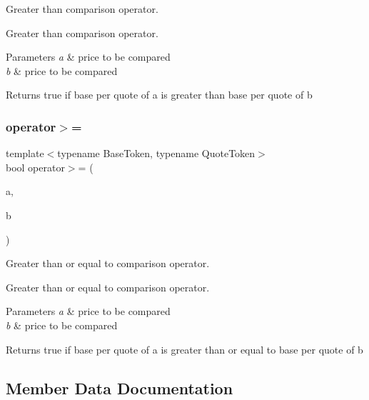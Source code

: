 Greater than comparison operator. 

Greater than comparison operator. 
\begin{DoxyParams}{Parameters}
{\em a} & price to be compared \\
\hline
{\em b} & price to be compared \\
\hline
\end{DoxyParams}
\begin{DoxyReturn}{Returns}
true if base per quote of a is greater than base per quote of b 
\end{DoxyReturn}
\mbox{\label{structaacio_1_1price_aa0f3fb89fde51f4f9b728e51b459abf6}} 
\subsubsection{\texorpdfstring{operator$>$=}{operator>=}}
{\footnotesize\ttfamily template$<$typename Base\+Token, typename Quote\+Token$>$ \\
bool operator$>$= (\begin{DoxyParamCaption}\item[{const \mbox{\hyperlink{structaacio_1_1price}{price}}$<$ Base\+Token, Quote\+Token $>$ \&}]{a,  }\item[{const \mbox{\hyperlink{structaacio_1_1price}{price}}$<$ Base\+Token, Quote\+Token $>$ \&}]{b }\end{DoxyParamCaption})\hspace{0.3cm}{\ttfamily [friend]}}



Greater than or equal to comparison operator. 

Greater than or equal to comparison operator. 
\begin{DoxyParams}{Parameters}
{\em a} & price to be compared \\
\hline
{\em b} & price to be compared \\
\hline
\end{DoxyParams}
\begin{DoxyReturn}{Returns}
true if base per quote of a is greater than or equal to base per quote of b 
\end{DoxyReturn}


\subsection{Member Data Documentation}
\mbox{\label{structaacio_1_1price_a8e52f70f4c5ab8807c6dd56acece363c}} 
